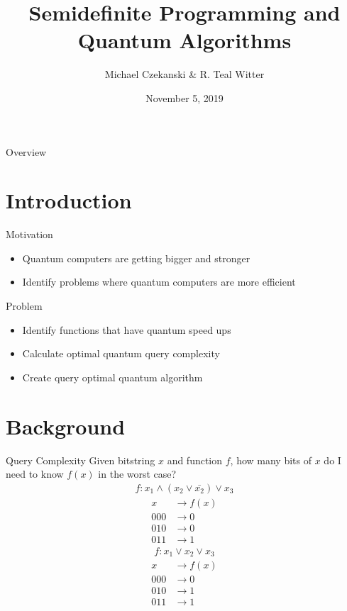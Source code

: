 \documentclass[12pt]{beamer}
\title{Semidefinite Programming and Quantum Algorithms}
\author{Michael Czekanski \& R. Teal Witter}
\institute{Middlebury College}
\date{November 5, 2019}
\begin{document}
\graphicspath{{./../figures/}}

\frame{\titlepage}

\begin{frame}{Overview}
\setcounter{tocdepth}{1}
\tableofcontents
\end{frame}

\section{Introduction}
\begin{frame}{Motivation}
    \begin{itemize}
        \item Quantum computers are getting bigger and stronger
        \item Identify problems where quantum computers are
        more efficient
    \end{itemize}
\end{frame}

\begin{frame}{Problem}
    \begin{itemize}
        \item Identify functions that have quantum speed ups
        \item Calculate optimal quantum query complexity
        \item Create query optimal quantum algorithm
    \end{itemize}
\end{frame}




\section{Background}
\begin{frame}{Query Complexity}
Given bitstring $x$ and function $f$,
how many bits of $x$ do I need to know $f(x)$ in the worst case?
{
\begin{align}
 f: x_1 \wedge (x_2 \vee \bar{x_2}) \vee x_3 \nonumber
\end{align}
}
{
\begin{align}
x &\rightarrow f(x) \nonumber \\
000 &\rightarrow 0 \nonumber \\
010 &\rightarrow 0 \nonumber \\
011 &\rightarrow 1 \nonumber
\end{align}
}
{
\begin{align}
 f: x_1 \vee x_2 \vee x_3 \nonumber
\end{align}
}
{
\begin{align}
x &\rightarrow f(x) \nonumber \\
000 &\rightarrow 0 \nonumber \\
010 &\rightarrow 1 \nonumber \\
011 &\rightarrow 1 \nonumber
\end{align}
}
\end{frame}
\end{document}
